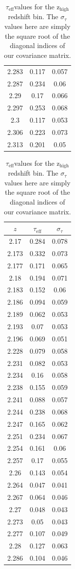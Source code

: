 \documentclass[preprint2,times,tighten]{aastex6}
\newcommand{\teff}{$\tau_\mathrm{eff}$\space}
\newcommand{\hiz}{$\mathrm{z_{high}}$\space}
\begin{document}
\begin{table}
{\begin{tabular}{ccc}
2.283 & 0.117 & 0.057 \\
2.287 & 0.234 & 0.06 \\
2.29 & 0.17 & 0.066 \\
2.297 & 0.253 & 0.068 \\
2.3 & 0.117 & 0.053 \\
2.306 & 0.223 & 0.073 \\
2.313 & 0.201 & 0.05 \\
\hline
\end{tabular}
}
\hfill
\parbox{.45\linewidth}{
\centering
\caption{\teff values for the \hiz redshift bin. The $\sigma_{\tau}$ values here are simply the square root of the diagonal indices of our covariance matrix.}
\label{tab:hiz_tab}
\vskip0.1in
\begin{tabular}{ccc}
\hline
\hline
$z$ & \teff & $\sigma_{\tau}$\\
\hline
2.17 & 0.284 & 0.078 \\
2.173 & 0.332 & 0.073 \\
2.177 & 0.171 & 0.065 \\
2.18 & 0.194 & 0.071 \\
2.183 & 0.152 & 0.06 \\
2.186 & 0.094 & 0.059 \\
2.189 & 0.062 & 0.053 \\
2.193 & 0.07 & 0.053 \\
2.196 & 0.069 & 0.051 \\
2.228 & 0.079 & 0.058 \\
2.231 & 0.082 & 0.053 \\
2.234 & 0.16 & 0.058 \\
2.238 & 0.155 & 0.059 \\
2.241 & 0.088 & 0.057 \\
2.244 & 0.238 & 0.068 \\
2.247 & 0.165 & 0.062 \\
2.251 & 0.234 & 0.067 \\
2.254 & 0.161 & 0.06 \\
2.257 & 0.17 & 0.055 \\
2.26 & 0.143 & 0.054 \\
2.264 & 0.047 & 0.041 \\
2.267 & 0.064 & 0.046 \\
2.27 & 0.048 & 0.043 \\
2.273 & 0.05 & 0.043 \\
2.277 & 0.107 & 0.049 \\
2.28 & 0.127 & 0.063 \\
2.286 & 0.104 & 0.046 \\

\end{tabular}}
\end{table}
\end{document}
